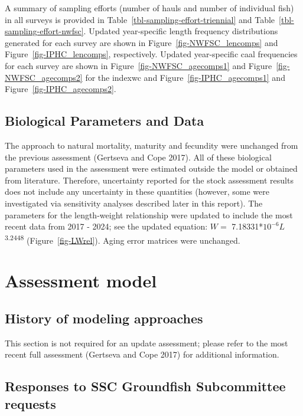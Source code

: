 \documentclass[
]{scrartcl}
\begin{document}
A summary of sampling efforts (number of hauls and number of individual
fish) in all surveys is provided in
Table~\ref{tbl-sampling-effort-triennial} and
Table~\ref{tbl-sampling-effort-nwfsc}. Updated year-specific length
frequency distributions generated for each survey are shown in
Figure~\ref{fig-NWFSC_lencomps} and Figure~\ref{fig-IPHC_lencomps},
respectively. Updated year-specific \gls{caal} frequencies for each
survey are shown in Figure~\ref{fig-NWFSC_agecomps1} and
Figure~\ref{fig-NWFSC_agecomps2} for the \gls{indexwc} and
Figure~\ref{fig-IPHC_agecomps1} and Figure~\ref{fig-IPHC_agecomps2}.

\subsection{Biological Parameters and
Data}\label{biological-parameters-and-data}

The approach to natural mortality, maturity and fecundity were unchanged
from the previous assessment (Gertseva and Cope 2017). All of these
biological parameters used in the assessment were estimated outside the
model or obtained from literature. Therefore, uncertainty reported for
the stock assessment results does not include any uncertainty in these
quantities (however, some were investigated via sensitivity analyses
described later in this report). The parameters for the length-weight
relationship were updated to include the most recent data from 2017 -
2024; see the updated equation: \(W =\)
7.18331*\(10^{-6}L\)\textsuperscript{3.2448} (Figure~\ref{fig-LWrel}).
Aging error matrices were unchanged.

\newpage{}

\section{Assessment model}\label{assessment-model}

\subsection{History of modeling
approaches}\label{history-of-modeling-approaches}

This section is not required for an update assessment; please refer to
the most recent full assessment (Gertseva and Cope 2017) for additional
information.

\subsection{Responses to SSC Groundfish Subcommittee
requests}\label{responses-to-ssc-groundfish-subcommittee-requests}
\end{document}

